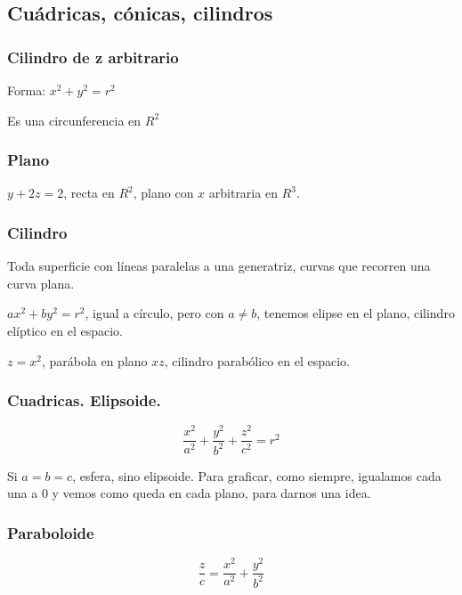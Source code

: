 \subsection{Cuádricas, cónicas, cilindros}

\subsubsection{Cilindro de z arbitrario}

Forma: \(x^{2} + y^{2} = r^{2}\)

Es una circunferencia en \(R^{2}\)

\subsubsection{Plano}

\(y + 2z = 2\), recta en \(R^{2}\), plano con \(x\) arbitraria en \(R^{3}\).

\subsubsection{Cilindro}

Toda superficie con líneas paralelas a una generatriz,
curvas que recorren una curva plana.

\(ax^{2} + by^{2} = r^{2}\), igual a círculo,
pero con \(a \neq b\), tenemos elipse en el plano,
cilindro elíptico en el espacio.

\(z = x^{2}\), parábola en plano \(xz\),
cilindro parabólico en el espacio.

\subsubsection{Cuadricas. Elipsoide.}

\begin{equation*}
    \frac{x^{2}}{a^{2}} + \frac{y^{2}}{b^{2}} + \frac{z^{2}}{c^{2}} = r^{2}
\end{equation*}

Si \(a = b = c\), esfera, sino elipsoide.
Para graficar,
como siempre, igualamos cada una a 0 y vemos como queda en cada plano,
para darnos una idea.

\subsubsection{Paraboloide}

\begin{equation*}
    \frac{z}{c} = \frac{x^{2}}{a^{2}} + \frac{y^{2}}{b^{2}}
\end{equation*}

